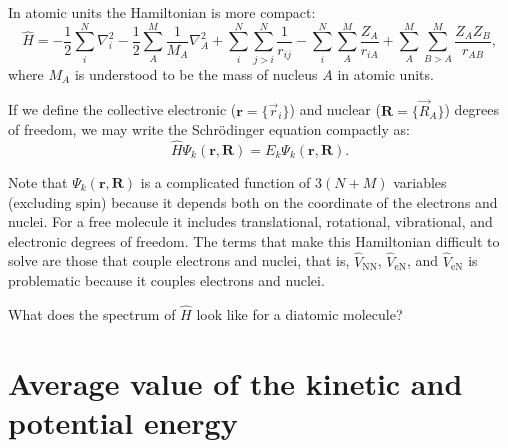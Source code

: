 \documentclass[../Main/chem532-notes.tex]{subfiles}
\begin{document}
In atomic units the Hamiltonian is more compact:
\begin{equation}
\label{eq:molecular_hamiltonian}
\hat{H} =
-\frac{1}{2} \sum_i^N \nabla^2_i
-\frac{1}{2} \sum_A^M \frac{1}{M_A} \nabla^2_A
+ \sum_{i}^{N}\sum_{j > i}^{N} \frac{1}{r_{ij}}
- \sum_{i}^{N} \sum_{A}^{M} \frac{Z_A}{r_{iA}}
+ \sum_{A}^{M} \sum_{B > A}^{M} \frac{Z_A Z_B}{r_{AB}},
\end{equation}
where $M_A$ is understood to be the mass of nucleus $A$ in atomic units.

If we define the collective electronic ($\mathbf{r} = \{ \vec{r}_i \}$) and nuclear ($\mathbf{R} = \{ \vec{R}_A \}$) degrees of freedom, we may write the Schr\"{o}dinger equation compactly as:
\begin{equation}
\hat{H} \Psi_k(\mathbf{r},\mathbf{R}) = E_k \Psi_k(\mathbf{r},\mathbf{R}).
\end{equation}

Note that $\Psi_k(\mathbf{r},\mathbf{R})$ is a complicated function of $3(N+M)$ variables (excluding spin) because it depends both on the coordinate of the electrons and nuclei. For a free molecule it includes translational, rotational, vibrational, and electronic degrees of freedom.
The terms that make this Hamiltonian difficult to solve are those that couple electrons and nuclei, that is, $\hat{V}_\mathrm{NN}$, $\hat{V}_\mathrm{eN}$, and $\hat{V}_\mathrm{eN}$ is problematic because it couples electrons and nuclei.

\begin{problem}	
What does the spectrum of $\hat{H}$ look like for a diatomic molecule?
\end{problem}


\section{Average value of the kinetic and potential energy}
\end{document}
